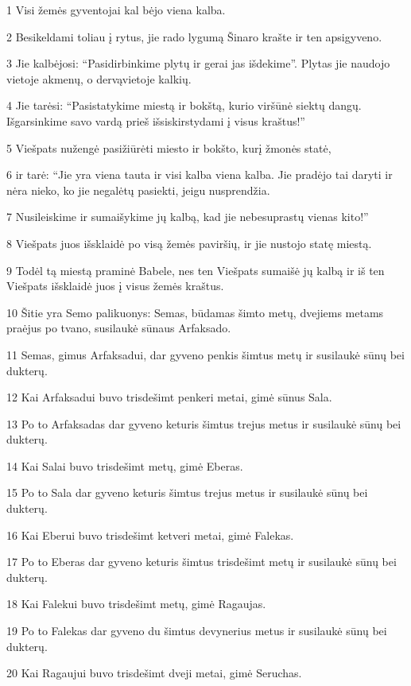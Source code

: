 \par 1 Visi žemės gyventojai kal bėjo viena kalba. 
\par 2 Besikeldami toliau į rytus, jie rado lygumą Šinaro krašte ir ten apsigyveno. 
\par 3 Jie kalbėjosi: “Pasidirbinkime plytų ir gerai jas išdekime”. Plytas jie naudojo vietoje akmenų, o dervą­vietoje kalkių. 
\par 4 Jie tarėsi: “Pasistatykime miestą ir bokštą, kurio viršūnė siektų dangų. Išgarsinkime savo vardą prieš išsiskirstydami į visus kraštus!” 
\par 5 Viešpats nužengė pasižiūrėti miesto ir bokšto, kurį žmonės statė, 
\par 6 ir tarė: “Jie yra viena tauta ir visi kalba viena kalba. Jie pradėjo tai daryti ir nėra nieko, ko jie negalėtų pasiekti, jeigu nusprendžia. 
\par 7 Nusileiskime ir sumaišykime jų kalbą, kad jie nebesuprastų vienas kito!” 
\par 8 Viešpats juos išsklaidė po visą žemės paviršių, ir jie nustojo statę miestą. 
\par 9 Todėl tą miestą praminė Babele, nes ten Viešpats sumaišė jų kalbą ir iš ten Viešpats išsklaidė juos į visus žemės kraštus. 
\par 10 Šitie yra Semo palikuonys: Semas, būdamas šimto metų, dvejiems metams praėjus po tvano, susilaukė sūnaus Arfaksado. 
\par 11 Semas, gimus Arfaksadui, dar gyveno penkis šimtus metų ir susilaukė sūnų bei dukterų. 
\par 12 Kai Arfaksadui buvo trisdešimt penkeri metai, gimė sūnus Sala. 
\par 13 Po to Arfaksadas dar gyveno keturis šimtus trejus metus ir susilaukė sūnų bei dukterų. 
\par 14 Kai Salai buvo trisdešimt metų, gimė Eberas. 
\par 15 Po to Sala dar gyveno keturis šimtus trejus metus ir susilaukė sūnų bei dukterų. 
\par 16 Kai Eberui buvo trisdešimt ketveri metai, gimė Falekas. 
\par 17 Po to Eberas dar gyveno keturis šimtus trisdešimt metų ir susilaukė sūnų bei dukterų. 
\par 18 Kai Falekui buvo trisdešimt metų, gimė Ragaujas. 
\par 19 Po to Falekas dar gyveno du šimtus devynerius metus ir susilaukė sūnų bei dukterų. 
\par 20 Kai Ragaujui buvo trisdešimt dveji metai, gimė Seruchas. 
